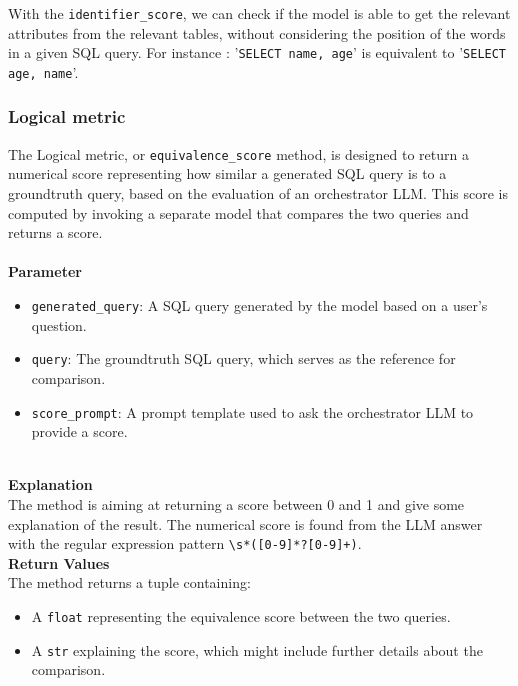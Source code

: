 \documentclass[12pt,a4paper]{article}
\begin{document}
With the \texttt{identifier\_score}, we can check if the model is able to get the relevant attributes from the relevant tables, without considering the position of the words in a given SQL query.
For instance : '\texttt{SELECT name, age}' is equivalent to '\texttt{SELECT age, name}'.

\subsubsection*{Logical metric}




The Logical metric, or \texttt{equivalence\_score} method, is designed to return a numerical score representing how similar a generated SQL query is to a groundtruth query, based on the evaluation of an orchestrator LLM. This score is computed by invoking a separate model that compares the two queries and returns a score.
\\
\\
\textbf{Parameter}
\begin{itemize}
    \item \texttt{generated\_query}: A SQL query generated by the model based on a user's question.
    \item \texttt{query}: The groundtruth SQL query, which serves as the reference for comparison.
    \item \texttt{score\_prompt}: A prompt template used to ask the orchestrator LLM to provide a score.
\end{itemize}
\\
\textbf{Explanation}
\\
The method is aiming at returning a score between 0 and 1 and give some explanation of the result. The numerical score is found from the LLM answer with the regular expression pattern \texttt{\textbackslash s*([0-9]*\.?[0-9]+)}.
\\

\textbf{Return Values}
\\
The method returns a tuple containing:
\begin{itemize}
    \item A \texttt{float} representing the equivalence score between the two queries.
    \item A \texttt{str} explaining the score, which might include further details about the comparison.
\end{itemize}
\end{document}
